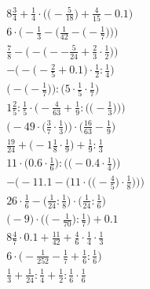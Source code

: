 \documentclass[8pt]{article}
\begin{document}
\begin{align}
8\frac{3}{4} + \frac{1}{4} \cdot \Big(\big(-\frac{5}{18}\big) + \frac{4}{15} - 0.1\Big) \\
6 \cdot \bigg(-\frac{1}{3} - \Big(\frac{1}{42} - \big(-\frac{1}{7}\big)\Big)\bigg) \\
\frac{7}{8} - \Big(-\big(--\frac{5}{24} + \frac{2}{3} \cdot \frac{1}{2}\big)\Big) \\
-\Big(-\big(-\frac{2}{5} + 0.1\big) \cdot \frac{1}{2} : \frac{1}{4}\Big) \\
\Big(-\big(-\frac{1}{7}\big)\Big) : \Big(5 \cdot \frac{1}{5} \cdot \frac{1}{7}\Big) \\
1\frac{2}{5} : \frac{1}{5} \cdot \bigg(-\frac{4}{63} + \frac{1}{9} : \Big(\big(-\frac{1}{3}\big)\Big)\bigg) \\
\Big(-49 \cdot \big(\frac{3}{7} \cdot \frac{1}{3}\big)\Big) \cdot \Big(\frac{16}{63} - \frac{1}{9}\Big) \\
\frac{19}{24} + \big(-1\frac{1}{8} \cdot \frac{1}{9}\big) + \frac{1}{9} : \frac{1}{3} \\
11 \cdot \Big(0.6 \cdot \frac{1}{6}\Big) : \Big(\big(-0.4 \cdot \frac{1}{4}\big)\Big) \\
-\Bigg(-11.1 - \bigg(11 \cdot \Big(\big(-\frac{4}{5}\big) \cdot \frac{1}{8}\Big)\bigg)\Bigg) \\
26 \cdot \frac{1}{6} - \big(\frac{1}{24} : \frac{1}{8}\big) \cdot \big(\frac{1}{24} : \frac{1}{6}\big) \\
\Big(-9\Big) \cdot \Big(\big(-\frac{1}{70}\big) : \frac{1}{7}\Big) + 0.1 \\
8\frac{4}{7} \cdot 0.1 + \frac{11}{42} + \frac{4}{6} \cdot \frac{1}{4} \cdot \frac{1}{3} \\
6 \cdot \big(-\frac{1}{252} - \frac{1}{7} + \frac{1}{6} : \frac{1}{6}\big) \\
\frac{1}{3} + \frac{1}{24} : \frac{1}{4} + \frac{1}{2} : \frac{1}{6} \cdot \frac{1}{6}
\end{align}
\end{document}

